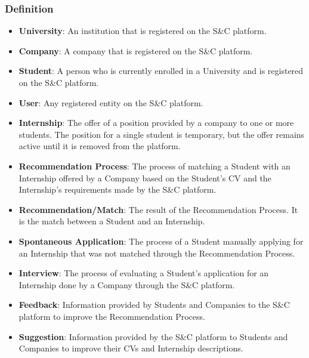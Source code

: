 \subsubsection{Definition}
\begin{itemize}
    \item \textcolor{titleColor}{\textbf{University}\label{def:university}}: An institution that is registered on the S\&C platform.
    \item \textcolor{titleColor}{\textbf{Company}\label{def:company}}: A company that is registered on the S\&C platform.
    \item \textcolor{titleColor}{\textbf{Student}\label{def:student}}: A person who is currently enrolled in a University and is registered on the S\&C platform.
    \item \textcolor{titleColor}{\textbf{User}\label{def:user}}: Any registered entity on the S\&C platform.
    \item \textcolor{titleColor}{\textbf{Internship}\label{def:internship}}: The offer of a position provided by a company to one or more students. The position for a single student is temporary, but the offer remains active until it is removed from the platform.
    \item \textcolor{titleColor}{\textbf{Recommendation Process}}\label{def:recommendationProcess}: The process of matching a Student with an Internship offered by a Company based on the Student's CV and the Internship's requirements made by the S\&C platform.
    \item \textcolor{titleColor}{\textbf{Recommendation/Match}\label{def:match}}: The result of the Recommendation Process. It is the match between a Student and an Internship.
    \item \textcolor{titleColor}{\textbf{Spontaneous Application}\label{def:spontaneousApplication}}: The process of a Student manually applying for an Internship that was not matched through the Recommendation Process.
    \item \textcolor{titleColor}{\textbf{Interview}\label{def:Interview}}: The process of evaluating a Student's application for an Internship done by a Company through the S\&C platform. 
    \item \textcolor{titleColor}{\textbf{Feedback}\label{def:Feedback}}: Information provided by Students and Companies to the S\&C platform to improve the Recommendation Process.
    \item \textcolor{titleColor}{\textbf{Suggestion}\label{def:suggestion}}: Information provided by the S\&C platform to Students and Companies to improve their CVs and Internship descriptions.

\end{itemize}
